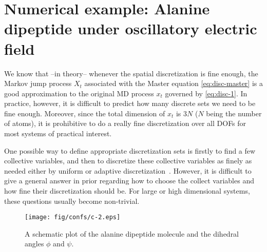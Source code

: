 \documentclass[aps, pre, preprint,unsortedaddress,a4paper,onecolumn]{revtex4}
\begin{document}




\section{Numerical example:
  Alanine dipeptide under oscillatory electric field}
\label{sec:alanine}

We know that --in theory-- whenever the spatial discretization is fine enough, the Markov jump
process $X_t$ associated with the Master equation \eqref{eq:disc-master} is a good approximation to the original
MD process $x_t$ governed by \eqref{eq:disc-1}.  In practice, however, it is difficult to predict
how many discrete sets we need to be fine enough. Moreover, since the
total dimension of $x_t$ is $3N$ ($N$ being the number of atoms), it is prohibitive to do a really fine discretization
over all DOFs for most systems of practical interest.

One possible way to define appropriate discretization sets is firstly to find a few collective
variables, and then to discretize these collective variables as finely as needed either by uniform or adaptive
discretization~\cite{chodera2007automatic, prinz2011markov}.
However, it is difficult to give a general answer in prior regarding
how to choose the collect variables and how fine their discretization should be.
For large or high dimensional systems, these questions usually become non-trivial. 

\begin{figure}
  \centering
  \texttt{[image: fig/confs/c-2.eps]}
  \caption{A schematic plot of the alanine dipeptide molecule and the dihedral angles $\phi$ and $\psi$.}
  \label{fig:tmp1}
\end{figure}
\end{document}
